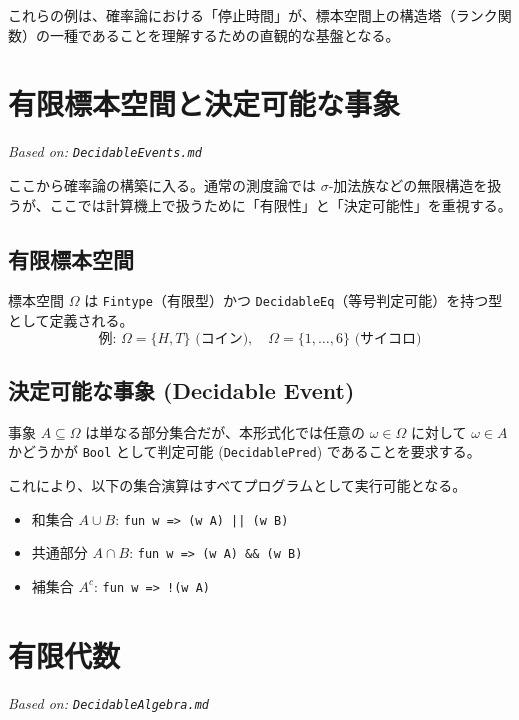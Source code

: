 \documentclass[a4paper,11pt]{ltjsarticle}
\theoremstyle{definition}
\newcommand{\OmegaSpace}{\Omega}
\begin{document}
これらの例は、確率論における「停止時間」が、標本空間上の構造塔（ランク関数）の一種であることを理解するための直観的な基盤となる。

\section{有限標本空間と決定可能な事象}
\label{sec:decidable_events}
\textit{Based on: \texttt{DecidableEvents.md}}

ここから確率論の構築に入る。通常の測度論では $\sigma$-加法族などの無限構造を扱うが、ここでは計算機上で扱うために「有限性」と「決定可能性」を重視する。

\subsection{有限標本空間}
標本空間 $\OmegaSpace$ は \texttt{Fintype}（有限型）かつ \texttt{DecidableEq}（等号判定可能）を持つ型として定義される。
\[ \text{例: } \OmegaSpace = \{H, T\} \text{ (コイン)}, \quad \OmegaSpace = \{1, \dots, 6\} \text{ (サイコロ)} \]

\subsection{決定可能な事象 (Decidable Event)}
事象 $A \subseteq \OmegaSpace$ は単なる部分集合だが、本形式化では任意の $\omega \in \OmegaSpace$ に対して $\omega \in A$ かどうかが \texttt{Bool} として判定可能 (\texttt{DecidablePred}) であることを要求する。

これにより、以下の集合演算はすべてプログラムとして実行可能となる。
\begin{itemize}
    \item 和集合 $A \cup B$: \texttt{fun w => (w \in A) || (w \in B)}
    \item 共通部分 $A \cap B$: \texttt{fun w => (w \in A) \&\& (w \in B)}
    \item 補集合 $A^c$: \texttt{fun w => !(w \in A)}
\end{itemize}

\section{有限代数}
\label{sec:decidable_algebra}
\textit{Based on: \texttt{DecidableAlgebra.md}}
\end{document}

